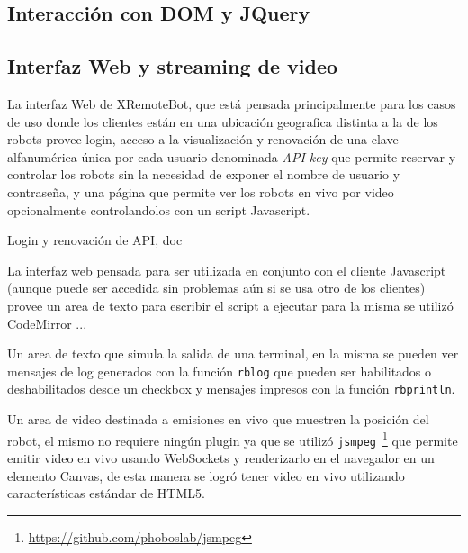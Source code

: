 \subsection{Interacción con DOM y JQuery}

\subsection{Interfaz Web y streaming de video}

La interfaz Web de XRemoteBot, que está pensada principalmente para los casos
de uso donde los clientes están en una ubicación geografica distinta a la de
los robots provee login, acceso a la visualización y renovación de una
clave alfanumérica única por cada usuario denominada \textit{API key} que
permite reservar y controlar los robots sin la necesidad de exponer el nombre
de usuario y contraseña, y una página que permite ver los robots en vivo por
video opcionalmente controlandolos con un script Javascript.

Login y renovación de API, doc

La interfaz web pensada para ser utilizada en conjunto con el cliente
Javascript (aunque puede ser accedida sin problemas aún si se usa
otro de los clientes) provee un area de texto para escribir el script
a ejecutar %
para la misma se utilizó CodeMirror ...

Un area de texto que simula la salida de una terminal, en la misma
se pueden ver mensajes de log generados con la función
\texttt{rblog} que pueden ser habilitados o deshabilitados desde un
checkbox y mensajes impresos con la función \texttt{rbprintln}.

Un area de video destinada a emisiones en vivo que muestren la posición
del robot, el mismo no requiere ningún plugin ya que se utilizó
\texttt{jsmpeg}~\footnote{\url{https://github.com/phoboslab/jsmpeg}}
que permite emitir video en vivo usando WebSockets y renderizarlo
en el navegador en un elemento Canvas, de esta manera se logró tener
video en vivo utilizando características estándar de HTML5.
